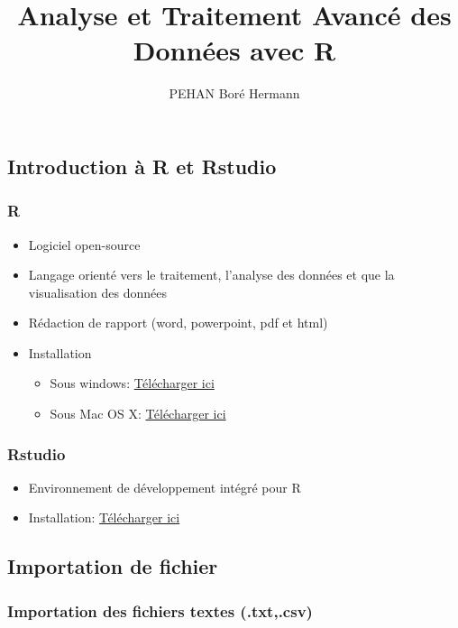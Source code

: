 \documentclass[
  letterpaper,
  DIV=11,
  numbers=noendperiod]{scrartcl}
\title{Analyse et Traitement Avancé des Données avec R}
\author{PEHAN Boré Hermann}
\date{}
\providecommand{\tightlist}{%
  \setlength{\itemsep}{0pt}\setlength{\parskip}{0pt}}\usepackage{longtable,booktabs,array}
\begin{document}
\maketitle

\subsection{Introduction à R et
Rstudio}\label{introduction-uxe0-r-et-rstudio}

\subsubsection{R}\label{r}

\begin{itemize}
\item
  Logiciel open-source
\item
  Langage orienté vers le traitement, l'analyse des données et que la
  visualisation des données
\item
  Rédaction de rapport (word, powerpoint, pdf et html)
\item
  Installation

  \begin{itemize}
  \tightlist
  \item
    Sous windows:
    \href{http://cran.r-project.org/bin/windows/base/}{Télécharger ici}
  \item
    Sous Mac OS X:
    \href{http://cran.r-project.org/bin/macosx/}{Télécharger ici}
  \end{itemize}
\end{itemize}

\subsubsection{Rstudio}\label{rstudio}

\begin{itemize}
\item
  Environnement de développement intégré pour R
\item
  Installation:
  \href{http://www.rstudio.com/products/rstudio/download/}{Télécharger
  ici}
\end{itemize}

\subsection{Importation de fichier}\label{importation-de-fichier}

\subsubsection{Importation des fichiers textes
(.txt,.csv)}\label{importation-des-fichiers-textes-.txt.csv}
\end{document}
